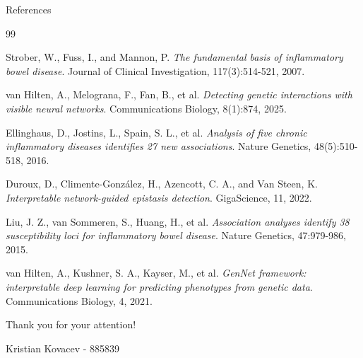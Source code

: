 \documentclass[aspectratio=169]{beamer}
\begin{document}
\begin{frame}[t, allowframebreaks]{References}
	\begin{thebibliography}{99}
		\scriptsize

		Strober, W., Fuss, I., and Mannon, P.
		\newblock \emph{The fundamental basis of inflammatory bowel disease}.
		\newblock Journal of Clinical Investigation, 117(3):514-521, 2007.

		van Hilten, A., Melograna, F., Fan, B., et al.
		\newblock \emph{Detecting genetic interactions with visible neural networks}.
		\newblock Communications Biology, 8(1):874, 2025.

		Ellinghaus, D., Jostins, L., Spain, S. L., et al.
		\newblock \emph{Analysis of five chronic inflammatory diseases identifies 27 new associations}.
		\newblock Nature Genetics, 48(5):510-518, 2016.

		Duroux, D., Climente-González, H., Azencott, C. A., and Van Steen, K.
		\newblock \emph{Interpretable network-guided epistasis detection}.
		\newblock GigaScience, 11, 2022.

		Liu, J. Z., van Sommeren, S., Huang, H., et al.
		\newblock \emph{Association analyses identify 38 susceptibility loci for inflammatory bowel disease}.
		\newblock Nature Genetics, 47:979-986, 2015.

		van Hilten, A., Kushner, S. A., Kayser, M., et al.
		\newblock \emph{GenNet framework: interpretable deep learning for predicting phenotypes from genetic data}.
		\newblock Communications Biology, 4, 2021.

	\end{thebibliography}
\end{frame}

\begin{frame}[standout]
    Thank you for your attention!
    \vspace{1.5cm}

    \normalsize{Kristian Kovacev - 885839} \\
\end{frame}
\end{document}
